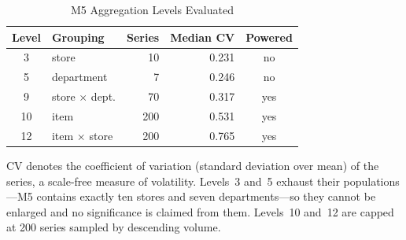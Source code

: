 \begin{table}[!t]
\caption{M5 Aggregation Levels Evaluated}
\label{tab:levels}
\centering
\begin{tabular}{@{}clrrc@{}}
\toprule
\textbf{Level} & \textbf{Grouping} & \textbf{Series} & \textbf{Median CV} & \textbf{Powered} \\
\midrule
3  & store                  &  10 & 0.231 & no \\
5  & department             &   7 & 0.246 & no \\
9  & store $\times$ dept.   &  70 & 0.317 & yes \\
10 & item                   & 200 & 0.531 & yes \\
12 & item $\times$ store    & 200 & 0.765 & yes \\
\bottomrule
\end{tabular}
\vspace{2pt}
\begin{minipage}{\columnwidth}
\footnotesize
CV denotes the coefficient of variation (standard deviation over mean) of the
series, a scale-free measure of volatility. Levels~3 and~5 exhaust their
populations---M5 contains exactly ten stores and seven departments---so they
cannot be enlarged and no significance is claimed from them. Levels~10 and~12
are capped at 200 series sampled by descending volume.
\end{minipage}
\end{table}
